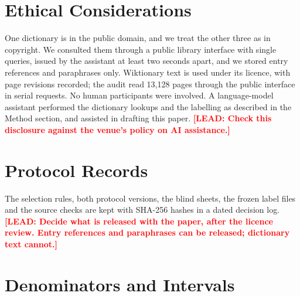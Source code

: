 \documentclass[11pt]{article}
\newcommand{\lead}[1]{\textcolor{red}{\textbf{[LEAD: #1]}}}
\begin{document}
\section*{Ethical Considerations}

One dictionary is in the public domain, and we treat the other three as in copyright. We consulted them through a public library interface with single queries, issued by the assistant at least two seconds apart, and we stored entry references and paraphrases only. Wiktionary text is used under its licence, with page revisions recorded; the audit read 13,128 pages through the public interface in serial requests. No human participants were involved. A language-model assistant performed the dictionary lookups and the labelling as described in the Method section, and assisted in drafting this paper. \lead{Check this disclosure against the venue's policy on AI assistance.}



\appendix

\section{Protocol Records}
\label{app:records}

The selection rules, both protocol versions, the blind sheets, the frozen label files and the source checks are kept with SHA-256 hashes in a dated decision log. \lead{Decide what is released with the paper, after the licence review. Entry references and paraphrases can be released; dictionary text cannot.}

\section{Denominators and Intervals}
\label{app:denominators}
\end{document}
